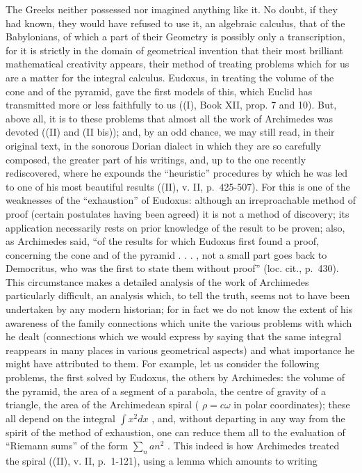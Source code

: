 The Greeks neither possessed nor imagined anything like it. No doubt, if they had known, they would have refused to use it, an algebraic calculus, that of the Babylonians, of which a part of their Geometry is possibly only a transcription, for it is strictly in the domain of geometrical invention that their most brilliant mathematical creativity appears, their method of treating problems which for us are a matter for the integral calculus. Eudoxus, in treating the volume of the cone and of the pyramid, gave the first models of this, which Euclid has transmitted more or less faithfully to us ((I), Book XII, prop. 7 and 10). But, above all, it is to these problems that almost all the work of Archimedes was devoted ((II) and (II bis)); and, by an odd chance, we may still read, in their original text, in the sonorous Dorian dialect in which they are so carefully composed, the greater part of his writings, and, up to the one recently rediscovered, where he expounds the ``heuristic'' procedures by which he was led to one of his most beautiful results ((II), v. II, p.~425-507). For this is one of the weaknesses of the ``exhaustion'' of Eudoxus: although an irreproachable method of proof (certain postulates having been agreed) it is not a method of discovery; its application necessarily rests on prior knowledge of the result to be proven; also, as Archimedes said, ``of the results for which Eudoxus first found a proof, concerning the cone and of the pyramid . . . , not a small part goes back to Democritus, who was the first to state them without proof'' (loc. cit., p.~430). This circumstance makes a detailed analysis of the work of Archimedes particularly difficult, an analysis which, to tell the truth, seems not to have been undertaken by any modern historian; for in fact we do not know the extent of his awareness of the family connections which unite the various problems with which he dealt (connections which we would express by saying that the same integral reappears in many places in various geometrical aspects) and what importance he might have attributed to them. For example, let us consider the following problems, the first solved by Eudoxus, the others by Archimedes: the volume of the pyramid, the area of a segment of a parabola, the centre of gravity of a triangle, the area of the Archimedean spiral ( \(\rho = c\omega\) in polar coordinates); these all depend on the integral \(\int x^2 dx\) , and, without departing in any way from the spirit of the method of exhaustion, one can reduce them all to the evaluation of ``Riemann sums'' of the form \(\sum_{n} an^2\) . This indeed is how Archimedes treated the spiral ((II), v. II, p.~1-121), using a lemma which amounts to writing

